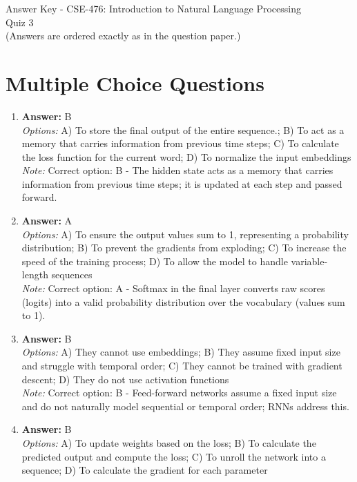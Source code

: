 \documentclass[12pt]{article}
\begin{document}
\begin{center}
Answer Key - CSE-476: Introduction to Natural Language Processing \\
Quiz 3 \\
\small (Answers are ordered exactly as in the question paper.)
\end{center}

\section*{Multiple Choice Questions}
\begin{enumerate}[label=Q\arabic*.]
\item \textbf{Answer:} B
\\ \textit{Options:} A) To store the final output of the entire sequence.; B) To act as a memory that carries information from previous time steps; C) To calculate the loss function for the current word; D) To normalize the input embeddings
\\ \textit{Note:} Correct option: B - The hidden state acts as a memory that carries information from previous time steps; it is updated at each step and passed forward.
\item \textbf{Answer:} A
\\ \textit{Options:} A) To ensure the output values sum to 1, representing a probability distribution; B) To prevent the gradients from exploding; C) To increase the speed of the training process; D) To allow the model to handle variable-length sequences
\\ \textit{Note:} Correct option: A - Softmax in the final layer converts raw scores (logits) into a valid probability distribution over the vocabulary (values sum to 1).
\item \textbf{Answer:} B
\\ \textit{Options:} A) They cannot use embeddings; B) They assume fixed input size and struggle with temporal order; C) They cannot be trained with gradient descent; D) They do not use activation functions
\\ \textit{Note:} Correct option: B - Feed-forward networks assume a fixed input size and do not naturally model sequential or temporal order; RNNs address this.
\item \textbf{Answer:} B
\\ \textit{Options:} A) To update weights based on the loss; B) To calculate the predicted output and compute the loss; C) To unroll the network into a sequence; D) To calculate the gradient for each parameter

\end{enumerate}
\end{document}
